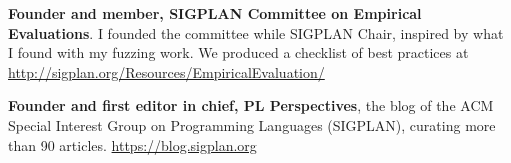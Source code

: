 \documentclass[11pt]{article}
\begin{document}
\begin{description}
\item \textbf{Founder and member, SIGPLAN Committee on Empirical
    Evaluations}. I founded the committee while SIGPLAN Chair,
  inspired by what I found with my fuzzing work. We produced a
  checklist of best practices at
  \url{http://sigplan.org/Resources/EmpiricalEvaluation/} 
\item \textbf{Founder and first editor in chief, PL Perspectives}, the
  blog of the ACM Special Interest Group on Programming Languages
  (SIGPLAN), curating more than 90 articles. \url{https://blog.sigplan.org}
\end{description}
\end{document}
